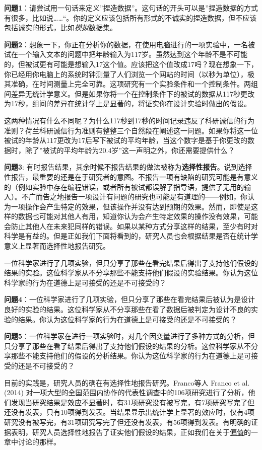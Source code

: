 \documentclass[
  letterpaper,
  DIV=11,
  numbers=noendperiod]{scrreprt}
\begin{document}
\textbf{问题1}：请尝试用一句话来定义''捏造数据''。这句话的开头可以是''捏造数据的方式有很多，比如说\ldots\ldots``。你的定义应该包括所有形式的不诚实的捏造数据，但不应该包括诚实的形式，比如\emph{模拟}数据集。

\textbf{问题2}：想象一下，你正在分析你的数据，在使用电脑进行的一项实验中，一名被试在一个输入文本的问题中把年龄输入为117岁。虽然达到这个年龄不是不可能的，但被试更有可能是想输入17这个值。应该把这个值改成17吗？现在想象一下，你已经用你电脑上的系统时钟测量了人们浏览一个网站的时间（以秒为单位），极其准确，在时间测量上完全可靠。这项研究有一个实验条件和一个控制条件。两组间差异无统计学意义。但是如果你将一个在控制条件下的被试的数据从117秒更改为17秒，组间的差异在统计学上是显著的，将证实你在设计实验时做出的假设。

这两种情况有什么不同呢？为什么117秒到17秒的时间记录违反了科研诚信的行为准则？荷兰科研诚信行为准则有整整三个自然段在阐述这一问题。如果你将这一位被试的年龄从117更改为17后写下被试的平均年龄，当这个数字是基于你更改的数据时，除了''被试的平均年龄为20.4岁''这一声明之外，你还需要提供什么？

\textbf{问题3}:
有时报告结果，其余时候不报告结果的做法被称为\textbf{选择性报告}。说到选择性报告，最重要的还是在于研究者的意图。不报告一项有缺陷的研究可能是有意义的（例如实验中存在编程错误，或者所有被试都误解了指导语，提供了无用的输入）。不广而告之地报告一项设计有问题的研究也可能是有道理的------例如，你认为一项操作会产生特定的效果，但该操作并没有达到预期的效果。然而，即使是这样的数据也可能对其他人有用，知道你认为会产生特定效果的操作没有效果，可能会防止其他人在未来犯同样的错误。如果以某种方式分享这样的结果，至少有时对科学是有益的。但是正如我们下面将看到的，研究人员也会根据结果是否在统计学意义上显著而选择性地报告研究。

一位科学家进行了几项实验，但只分享了那些在看完结果后得出了支持他们假设的结果的实验。这位科学家从不分享那些不能支持他们假设的实验结果。你认为这位科学家的行为在道德上是可接受的还是不可接受的？

\textbf{问题4}：一位科学家进行了几项实验，但只分享了那些在看完结果后被认为是设计良好的实验的结果。这位科学家从不分享那些在看了数据后被判定为设计不良的实验的结果。你认为这位科学家的行为在道德上是可接受的还是不可接受的？

\textbf{问题5}：一位科学家在进行一项实验时，对几个因变量进行了多种方式的分析，但只分享了那些在看了结果后得出了支持他们假设的结果的分析。这位科学家从不分享那些不能支持他们的假设的分析结果。你认为这位科学家的行为在道德上是可接受的还是不可接受的？

目前的实践是，研究人员的确在有选择性地报告研究。Franco等人 Franco et al.
(2014)
对一项大型的全国范围内协作的代表性调查中的106项研究进行了分析，他们发现当研究结果是效应不显著时，有31项研究没有被写完，有7项研究写完了但还没有发表，只有10项得到发表。当结果显示出统计学上显著的效应时，仅有4项研究没有被写完，有31项研究写完了但还没有发表，有56项得到发表。有明确的证据表明，研究人员选择性地报告了证实他们假设的结果，正如我们在关于\protect\hyperlink{ux504fux501a}{偏倚}的一章中讨论的那样。
\end{document}
